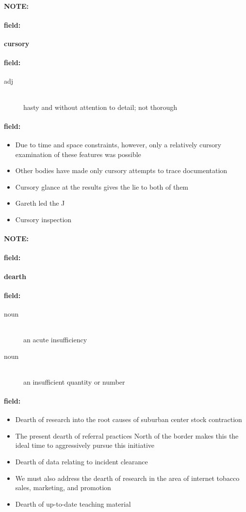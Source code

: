 \documentclass[12pt]{article}
\newenvironment{note}{\paragraph{NOTE:}}{}
\newenvironment{field}{\paragraph{field:}}{}
\begin{document}
\begin{note}
\begin{field}
\textbf{\large cursory}
\end{field}


\begin{field}
\begin{description}
\item[adj] \hfill \\ 
hasty and without attention to detail; not thorough

\end{description}
\end{field}

\begin{field}
\begin{itemize}
\item Due to time and space constraints, however, only a relatively cursory examination of these features was possible
\item Other bodies have made only cursory attempts to trace documentation
\item Cursory glance at the results gives the lie to both of them
\item Gareth led the J
\item Cursory inspection
\end{itemize}
\end{field}
\end{note}
\begin{note}
\begin{field}
\textbf{\large dearth}
\end{field}


\begin{field}
\begin{description}
\item[noun] \hfill \\ 
an acute insufficiency

\item[noun] \hfill \\ 
an insufficient quantity or number

\end{description}
\end{field}

\begin{field}
\begin{itemize}
\item Dearth of research into the root causes of suburban center stock contraction
\item The present dearth of referral practices North of the border makes this the ideal time to aggressively pursue this initiative
\item Dearth of data relating to incident clearance
\item We must also address the dearth of research in the area of internet tobacco sales, marketing, and promotion
\item Dearth of up-to-date teaching material
\end{itemize}
\end{field}
\end{note}
\end{document}
